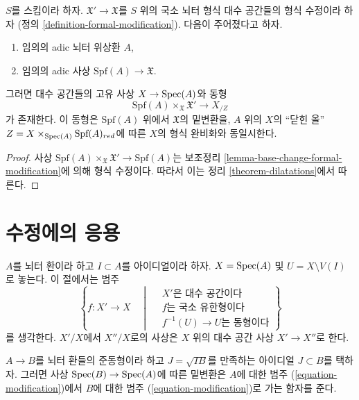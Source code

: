 \begin{lemma}
\label{lemma-formal-modifications-locally-algebraic}
$S$를 스킴이라 하자. $\mathfrak X' \to \mathfrak X$를
$S$ 위의 국소 뇌터 형식 대수 공간들의 형식 수정이라 하자
(정의 \ref{definition-formal-modification}). 다음이 주어졌다고 하자.
\begin{enumerate}
\item 임의의 adic 뇌터 위상환 $A$,
\item 임의의 adic 사상 $\text{Spf}(A) \longrightarrow \mathfrak X$.
\end{enumerate}
그러면 대수 공간들의 고유 사상 $X \to \mathop{\mathrm{Spec}}(A)$와 동형
$$
\text{Spf}(A) \times_{\mathfrak X} \mathfrak X'
\longrightarrow
X_{/Z}
$$
가 존재한다. 이 동형은 $\text{Spf}(A)$ 위에서
$\mathfrak X$의 밑변환을, $A$ 위의 $X$의 ``닫힌 올''
$Z = X \times_{\mathop{\mathrm{Spec}}(A)} \text{Spf}(A)_{red}$에 따른
$X$의 형식 완비화와 동일시한다.
\end{lemma}

\begin{proof}
사상 $\text{Spf}(A) \times_{\mathfrak X} \mathfrak X'
\to \text{Spf}(A)$는 보조정리
\ref{lemma-base-change-formal-modification}에 의해 형식 수정이다.
따라서 이는 정리 \ref{theorem-dilatations}에서 따른다.
\end{proof}


\section{수정에의 응용}
\label{section-modifications}

\noindent
$A$를 뇌터 환이라 하고 $I \subset A$를 아이디얼이라 하자.
$X = \mathop{\mathrm{Spec}}(A)$ 및 $U = X \setminus V(I)$로 놓는다.
이 절에서는 범주
\begin{equation}
\label{equation-modification}
\left\{
f : X' \longrightarrow X
\quad \middle| \quad
\begin{matrix}
X'\text{은 대수 공간이다}\\
f\text{는 국소 유한형이다}\\
f^{-1}(U) \to U\text{는 동형이다}
\end{matrix}
\right\}
\end{equation}
를 생각한다. $X'/X$에서 $X''/X$로의 사상은
$X$ 위의 대수 공간 사상 $X' \to X''$로 한다.

\medskip\noindent
$A \to B$를 뇌터 환들의 준동형이라 하고 $J = \sqrt{I B}$를 만족하는
아이디얼 $J \subset B$를 택하자. 그러면 사상
$\mathop{\mathrm{Spec}}(B) \to \mathop{\mathrm{Spec}}(A)$에 따른 밑변환은 $A$에 대한 범주
(\ref{equation-modification})에서 $B$에 대한 범주
(\ref{equation-modification})로 가는 함자를 준다.


